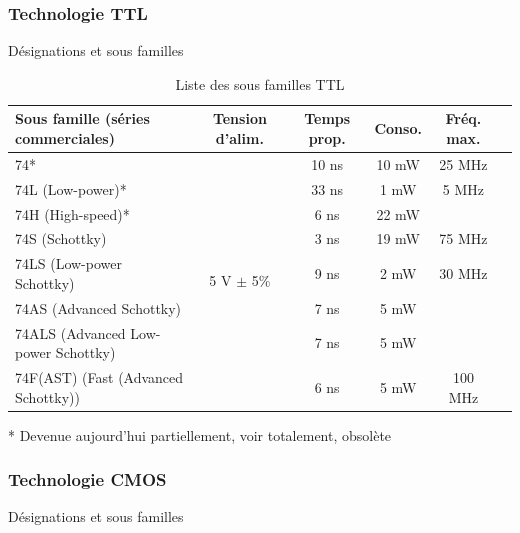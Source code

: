 \documentclass[a4paper]{article}
\begin{document}
\subsubsection{Technologie TTL}

Désignations et sous familles

\begin{table}[H]
	\centering
		\begin{tabular}{|l|c|c|c|c|c|}\hline
				Sous famille (séries commerciales) & Tension d'alim. & Temps prop. & Conso. & Fréq. max.\\\hline\hline
				74* & \multirow{8}{*}{5 V $\pm$ 5\%} & 10 ns & 10 mW & 25 MHz\\\cline{1-1}\cline{3-5}
				74L (Low-power)* & & 33 ns & 1 mW & 5 MHz\\\cline{1-1}\cline{3-5}
				74H (High-speed)* & & 6 ns & 22 mW & \\\cline{1-1}\cline{3-5}
				74S (Schottky) & & 3 ns & 19 mW & 75 MHz\\\cline{1-1}\cline{3-5}
				74LS (Low-power Schottky) & & 9 ns & 2 mW & 30 MHz\\\cline{1-1}\cline{3-5}
				74AS (Advanced Schottky) & & 7 ns & 5 mW & \\\cline{1-1}\cline{3-5}
				74ALS (Advanced Low-power Schottky) & & 7 ns & 5 mW & \\\cline{1-1}\cline{3-5}
				74F(AST) (Fast (Advanced Schottky)) & & 6 ns & 5 mW & 100 MHz\\\hline
		\end{tabular}
		\caption{Liste des sous familles \ac{TTL}
			\label{Liste_des_sous_familles_TTL}}
\end{table}
* Devenue aujourd'hui partiellement, voir totalement, obsolète

\subsubsection{Technologie CMOS}

Désignations et sous familles
\end{document}

